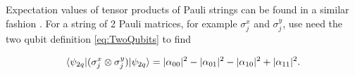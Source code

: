 Expectation values of tensor products of Pauli strings can be found in a similar fashion \cite{LaRose2021}. For a string of 2 Pauli matrices, for example $\sigma_j^x$ and $\sigma_j^y$, use need the two qubit definition \cref{eq:TwoQubits} to find

\begin{equation}\label{eq:ExpectTensor}
	\langle\psi_{2q}\rvert( \sigma_j^x \otimes \sigma_j^ y) \lvert\psi_{2q}\rangle 
	= |\alpha_{00}|^2 - |\alpha_{01}|^2 - |\alpha_{10}|^2 + |\alpha_{11}|^2.
\end{equation}







